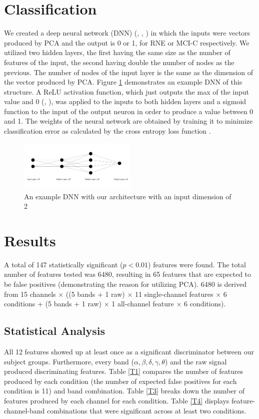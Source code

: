 \documentclass[Afour,times,sageh]{sagej}
\begin{document}
\section{Classification}
We created a deep neural network (DNN) (\citet{Islam2017}, \citet{Zhao2014}, \citet{Morabito2016}) in which the inputs were vectors produced by PCA and the output is 0 or 1, for RNE or MCI-C respectively. We utilized two hidden layers, the first having the same size as the number of features of the input, the second having double the number of nodes as the previous. The number of nodes of the input layer is the same as the dimension of the vector produced by PCA. Figure \ref{NN} demonstrates an example DNN  of this structure. A ReLU activation function, which just outputs the max of the input value and 0 (\citet{Xu2015}, \citet{Hahnloser2000}), was applied to the inputs to both hidden layers and a sigmoid function to the input of the output neuron in order to produce a value between 0 and 1. The weights of the neural network are obtained by training it to minimize classification error as calculated by the cross entropy loss function \citep{deBoer2005}. 
\begin{figure}
 \centering
\includegraphics[width=0.5\textwidth]{figures/DNN}
\caption{An example DNN with our architecture with an input dimension of 2}
\label{NN}
 \end{figure}
 \section{Results}
A total of 147 statistically significant ($p < 0.01$) features were found. The total number of features tested was 6480, resulting in 65 features that are expected to be false positives (demonstrating the reason for utilizing PCA). 6480 is derived from 15 channels $\times$ ((5 bands + 1 raw) $\times$ 11 single-channel features $\times$ 6 conditions + (5 bands + 1 raw) $\times$ 1 all-channel feature $\times$ 6 conditions). 
\subsection{Statistical Analysis}
All 12 features showed up at least once as a significant discriminator between our subject groups. Furthermore, every band ($\alpha, \beta, \delta, \gamma, \theta$) and the raw signal produced discriminating features. Table \ref{T1} compares the number of features produced by each condition (the number of expected false positives for each condition is 11) and band combination. Table \ref{T3} breaks down the number of features produced by each channel for each condition. Table \ref{T4} displays feature-channel-band combinations that were significant across at least two conditions. 
\end{document}
